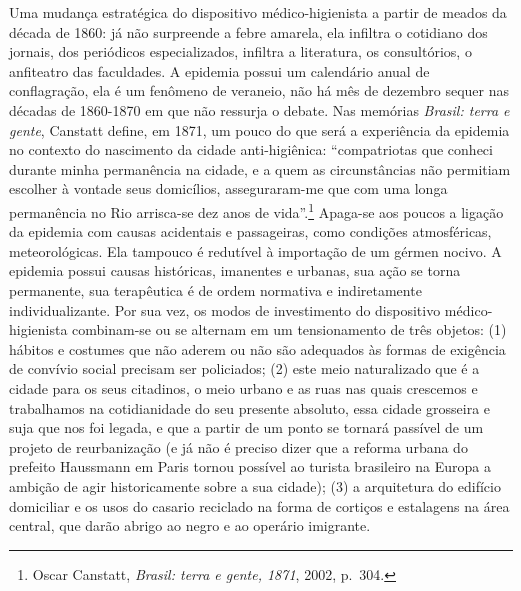 Uma mudança estratégica do dispositivo médico-higienista a partir de
meados da década de 1860: já não surpreende a febre amarela, ela
infiltra o cotidiano dos jornais, dos periódicos especializados,
infiltra a literatura, os consultórios, o anfiteatro das faculdades. A
epidemia possui um calendário anual de conflagração, ela é um fenômeno
de veraneio, não há mês de dezembro sequer nas décadas de 1860-1870 em
que não ressurja o debate. Nas memórias \textit{Brasil: terra e gente},
Canstatt define, em 1871, um pouco do que será a experiência da epidemia
no contexto do nascimento da cidade anti-higiênica: ``compatriotas que
conheci durante minha permanência na cidade, e a quem as circunstâncias
não permitiam escolher à vontade seus domicílios, asseguraram-me que com
uma longa permanência no Rio arrisca-se dez anos de vida''.\footnote{Oscar
  Canstatt, \textit{Brasil: terra e gente, 1871}, 2002, p.~304.} Apaga-se
aos poucos a ligação da epidemia com causas acidentais e passageiras,
como condições atmosféricas, meteorológicas. Ela tampouco é redutível à
importação de um gérmen nocivo. A epidemia possui causas históricas,
imanentes e urbanas, sua ação se torna permanente, sua terapêutica é de
ordem normativa e indiretamente individualizante. Por sua vez, os modos
de investimento do dispositivo médico-higienista combinam-se ou se
alternam em um tensionamento de três objetos: (1) hábitos e costumes que
não aderem ou não são adequados às formas de exigência de convívio
social precisam ser policiados; (2) este meio naturalizado que é a
cidade para os seus citadinos, o meio urbano e as ruas nas quais
crescemos e trabalhamos na cotidianidade do seu presente absoluto, essa
cidade grosseira e suja que nos foi legada, e que a partir de um ponto
se tornará passível de um projeto de reurbanização (e já não é preciso
dizer que a reforma urbana do prefeito Haussmann em Paris tornou
possível ao turista brasileiro na Europa a ambição de agir
historicamente sobre a sua cidade); (3) a arquitetura do edifício
domiciliar e os usos do casario reciclado na forma de cortiços e
estalagens na área central, que darão abrigo ao negro e ao operário
imigrante.


